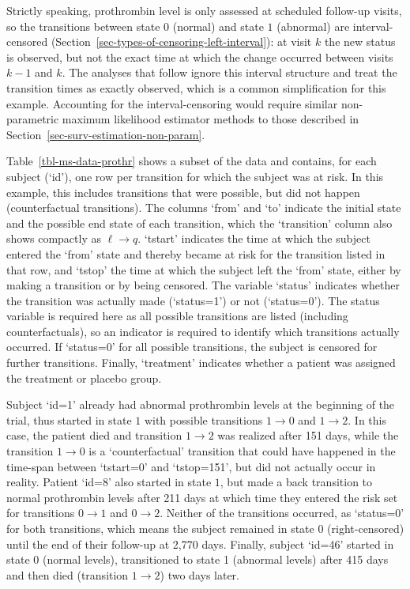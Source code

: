 \documentclass[
  letterpaper,
  krantz2]{style/krantz}
\begin{document}
Strictly speaking, prothrombin level is only assessed at scheduled
follow-up visits, so the transitions between state \(0\) (normal) and
state \(1\) (abnormal) are interval-censored
(Section~\ref{sec-types-of-censoring-left-interval}): at visit \(k\) the
new status is observed, but not the exact time at which the change
occurred between visits \(k-1\) and \(k\). The analyses that follow
ignore this interval structure and treat the transition times as exactly
observed, which is a common simplification for this example. Accounting
for the interval-censoring would require similar non-parametric maximum
likelihood estimator
methods to those described in
Section~\ref{sec-surv-estimation-non-param}.

Table~\ref{tbl-ms-data-prothr} shows a subset of the data and contains,
for each subject (`id'), one row per transition for which the subject
was at risk. In this example, this includes transitions that were
possible, but did not happen (counterfactual transitions). The columns
`from' and `to' indicate the initial state and the possible end state of
each transition, which the `transition' column also shows compactly as
\(\ell \rightarrow q\). `tstart' indicates the time at which the subject
entered the `from' state and thereby became at risk for the transition
listed in that row, and `tstop' the time at which the subject left the
`from' state, either by making a transition or by being censored. The
variable `status' indicates whether the transition was actually made
(`status=1') or not (`status=0'). The status variable is required here
as all possible transitions are listed (including counterfactuals), so
an indicator is required to identify which transitions actually
occurred. If `status=0' for all possible transitions, the subject is
censored for further transitions. Finally, `treatment' indicates whether
a patient was assigned the treatment or placebo group.

Subject `id=1' already had abnormal prothrombin levels at the beginning
of the trial, thus started in state \(1\) with possible transitions
\(1\rightarrow 0\) and \(1 \rightarrow 2\). In this case, the patient
died and transition \(1\rightarrow 2\) was realized after 151 days,
while the transition \(1 \rightarrow 0\) is a `counterfactual'
transition that could have happened in the time-span between `tstart=0'
and `tstop=151', but did not actually occur in reality. Patient `id=8'
also started in state \(1\), but made a back transition to normal
prothrombin levels after 211 days at which time they entered the risk
set for transitions \(0\rightarrow 1\) and \(0\rightarrow 2\). Neither
of the transitions occurred, as `status=0' for both transitions, which
means the subject remained in state \(0\) (right-censored) until the end
of their follow-up at 2,770 days. Finally, subject `id=46' started in
state 0 (normal levels), transitioned to state 1 (abnormal levels) after
415 days and then died (transition \(1\rightarrow 2\)) two days later.
\end{document}
